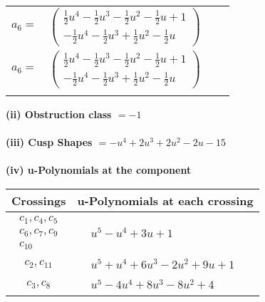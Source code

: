 \documentclass[1p]{elsarticle_modified}
\theoremstyle{definition}
\begin{document}
\begin{tabular}{m{7pt} m{180pt} m{7pt} m{180pt} }
\flushright $a_{6}=$&$\begin{pmatrix}\frac{1}{2} u^4-\frac{1}{2} u^3-\frac{1}{2} u^2-\frac{1}{2} u+1\\-\frac{1}{2} u^4-\frac{1}{2} u^3+\frac{1}{2} u^2-\frac{1}{2} u\end{pmatrix}$\\ \flushright $a_{6}=$&$\begin{pmatrix}\frac{1}{2} u^4-\frac{1}{2} u^3-\frac{1}{2} u^2-\frac{1}{2} u+1\\-\frac{1}{2} u^4-\frac{1}{2} u^3+\frac{1}{2} u^2-\frac{1}{2} u\end{pmatrix}$\\&\end{tabular}
\flushleft \textbf{(ii) Obstruction class $= -1$}\\~\\
\flushleft \textbf{(iii) Cusp Shapes $= - u^4+2 u^3+2 u^2-2 u-15$}\\~\\
\newpage\renewcommand{\arraystretch}{1}
\flushleft \textbf{(iv) u-Polynomials at the component}\newline \\
\begin{tabular}{m{50pt}|m{274pt}}
Crossings & \hspace{64pt}u-Polynomials at each crossing \\
\hline $$\begin{aligned}c_{1},c_{4},c_{5}\\c_{6},c_{7},c_{9}\\c_{10}\end{aligned}$$&$\begin{aligned}
&u^5- u^4+3 u+1
\end{aligned}$\\
\hline $$\begin{aligned}c_{2},c_{11}\end{aligned}$$&$\begin{aligned}
&u^5+u^4+6 u^3-2 u^2+9 u+1
\end{aligned}$\\
\hline $$\begin{aligned}c_{3},c_{8}\end{aligned}$$&$\begin{aligned}
&u^5-4 u^4+8 u^3-8 u^2+4
\end{aligned}$\\
\hline
\end{tabular}\\~\\
\end{document}
